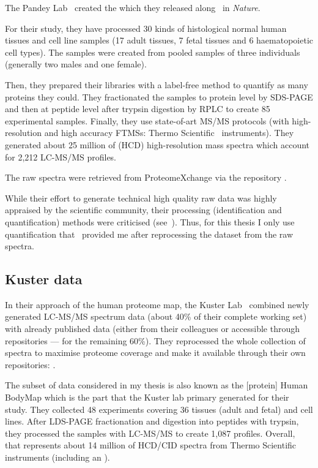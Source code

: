 The Pandey Lab~ created the
 which
they released along~ in \emph{Nature}.

For their study, they have processed 30 kinds of histological normal human
tissues and cell line samples (17 adult tissues, 7 fetal tissues and 6
haematopoietic cell types). The samples were created from pooled samples of three
individuals (generally two males and one female).

Then, they prepared their libraries with a label-free method to quantify
as many proteins they could. They fractionated the samples to protein level by
\gls{SDS-PAGE} and then at peptide level after trypsin digestion by \gls{RPLC}
to create 85 experimental samples. Finally, they use state-of-art \gls{MS/MS}
protocols (with high-resolution and high accuracy \glspl{FTMS}:
Thermo Scientific \orbi\ instruments).
They generated about 25 million of (\gls{HCD})
high-resolution mass spectra which account for 2,212 \gls{LC-MS/MS} profiles.

The raw spectra were retrieved from ProteomeXchange via the repository
.

While their effort to generate technical high quality raw data was highly
appraised by the scientific community, their processing
(identification and quantification) methods were
criticised (see~).
Thus, for this thesis I only use
quantification that \james\ provided me after reprocessing the dataset
from the raw spectra.

\subsection{Kuster data}

In their approach of the human proteome map, the Kuster Lab~
combined newly generated \gls{LC-MS/MS} spectrum data (about 40\% of their
complete working set) with already published data (either from their colleagues
or accessible through repositories --- for the remaining 60\%). They reprocessed
the whole collection of spectra to maximise proteome coverage
and make it available through their own repositories:
.

The subset of data considered in my thesis is also
known as the [protein] Human BodyMap which is the part that the Kuster lab
primary generated for their study. They collected 48 experiments covering 36
tissues (adult and fetal) and cell lines. After \gls{LDS-PAGE} fractionation and
digestion into peptides with trypsin, they processed the samples with
\gls{LC-MS/MS} to create 1,087 profiles.  Overall, that represents about
14 million of \gls{HCD}/\gls{CID} spectra from Thermo Scientific instruments
(including an \orbi).

